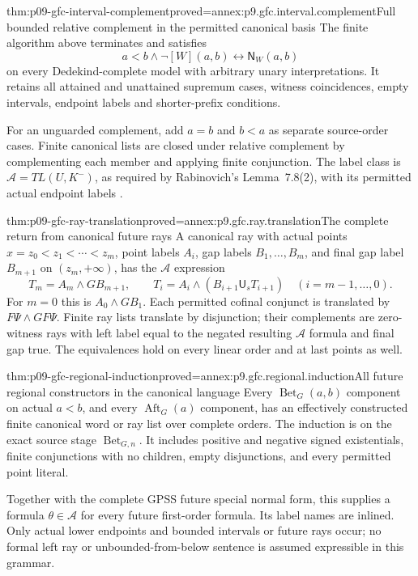 \begin{hbtheorem}{thm:p09-gfc-interval-complement}{proved=annex:p9.gfc.interval.complement}{Full bounded relative complement in the permitted canonical basis}
The finite algorithm above terminates and satisfies
\[
       a<b\land\neg[W](a,b)
                            \longleftrightarrow\mathsf N_W(a,b)
\]
on every Dedekind-complete model with arbitrary unary
interpretations. It retains all attained and unattained
supremum cases, witness coincidences, empty intervals,
endpoint labels and shorter-prefix conditions.

For an unguarded complement, add \(a=b\) and \(b<a\)
as separate source-order cases. Finite canonical lists
are closed under relative complement by complementing
each member and applying finite conjunction. The label
class is \(\mathcal A=TL(U,K^-)\), as required by
Rabinovich's Lemma~7.8(2), with its permitted actual
endpoint labels \cite[pp.~9--11, 14]{Rabinovich2014Kamp}.
\end{hbtheorem}

\begin{hblemma}{thm:p09-gfc-ray-translation}{proved=annex:p9.gfc.ray.translation}{The complete return from canonical future rays}
A canonical ray with actual points
\(x=z_0<z_1<\cdots<z_m\), point labels \(A_i\),
gap labels \(B_1,\ldots,B_m\), and final gap label
\(B_{m+1}\) on \((z_m,+\infty)\), has the
\(\mathcal A\) expression
\[
 T_m=A_m\land G B_{m+1},\qquad
 T_i=A_i\land(B_{i+1}\mathbin{\mathsf U_s}T_{i+1})
                              \quad(i=m-1,\ldots,0).
\]
For \(m=0\) this is \(A_0\land GB_1\).
Each permitted cofinal conjunct is translated by
\(F\Psi\land GF\Psi\). Finite ray lists translate
by disjunction; their complements are zero-witness
rays with left label equal to the negated resulting
\(\mathcal A\) formula and final gap true.
The equivalences hold on every linear order and at
last points as well.
\end{hblemma}

\begin{hblemma}{thm:p09-gfc-regional-induction}{proved=annex:p9.gfc.regional.induction}{All future regional constructors in the canonical language}
Every \(\operatorname{Bet}_G(a,b)\) component on
actual \(a<b\), and every \(\operatorname{Aft}_G(a)\)
component, has an effectively constructed finite
canonical word or ray list over complete orders.
The induction is on the exact source stage
\(\operatorname{Bet}_{G,n}\). It includes positive
and negative signed existentials, finite conjunctions
with no children, empty disjunctions, and every
permitted point literal.

Together with the complete GPSS future special normal
form, this supplies a formula \(\theta\in\mathcal A\)
for every future first-order formula. Its label names
are inlined. Only actual lower endpoints and bounded
intervals or future rays occur; no formal left ray or
unbounded-from-below sentence is assumed expressible
in this grammar.
\end{hblemma}

